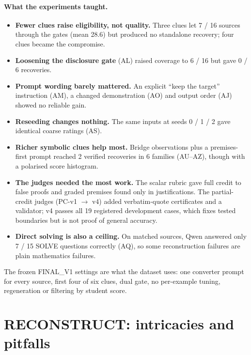 \documentclass[11pt,a4paper]{article}
\begin{document}
\paragraph{What the experiments taught.}
\begin{itemize}
\item \textbf{Fewer clues raise eligibility, not quality.} Three clues let 7 / 16 sources through the gates (mean 28.6) but produced no standalone recovery; four clues became the compromise.
\item \textbf{Loosening the disclosure gate} (AL) raised coverage to 6 / 16 but gave 0 / 6 recoveries.
\item \textbf{Prompt wording barely mattered.} An explicit ``keep the target'' instruction (AM), a changed demonstration (AO) and output order (AJ) showed no reliable gain.
\item \textbf{Reseeding changes nothing.} The same inputs at seeds 0 / 1 / 2 gave identical coarse ratings (AS).
\item \textbf{Richer symbolic clues help most.} Bridge observations plus a premises-first prompt reached 2 verified recoveries in 6 families (AU--AZ), though with a polarised score histogram.
\item \textbf{The judges needed the most work.} The scalar rubric gave full credit to false proofs and graded premises found only in justifications. The partial-credit judges (PC-v1 $\to$ v4) added verbatim-quote certificates and a validator; v4 passes all 19 registered development cases, which fixes tested boundaries but is not proof of general accuracy.
\item \textbf{Direct solving is also a ceiling.} On matched sources, Qwen answered only 7 / 15 SOLVE questions correctly (AQ), so some reconstruction failures are plain mathematics failures.
\end{itemize}

The frozen FINAL\_V1 settings are what the dataset uses: one converter prompt for every source, first four of six clues, dual gate, no per-example tuning, regeneration or filtering by student score.

\section{RECONSTRUCT: intricacies and pitfalls}
\end{document}
